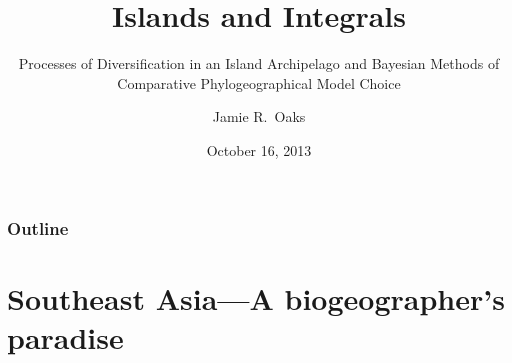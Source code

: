 


\title[Islands and Integrals]{Islands and Integrals}
\subtitle{Processes of Diversification in an Island Archipelago and Bayesian
    Methods of Comparative Phylogeographical Model Choice}

\author[J.\ Oaks]{
    Jamie R.\ Oaks %
}

\date{October 16, 2013}


\maketitle

\begin{frame}
\frametitle{Outline}
\tableofcontents
\end{frame}


\section{Southeast Asia---A biogeographer's paradise}

